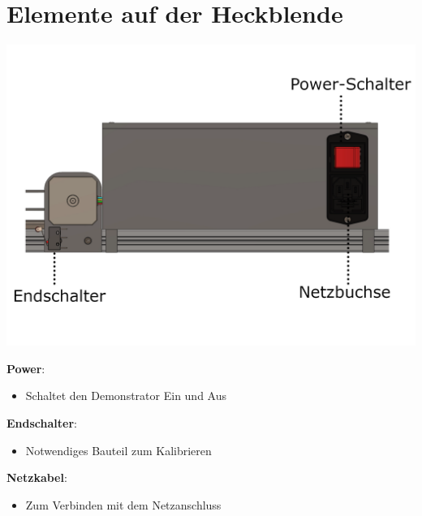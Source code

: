 %
%

\chapter{Elemente auf der Heckblende}
\begin{center}
	
	\includegraphics[width=\textwidth]{Images/Konstruktion3.png}
\end{center}

\textbf{Power}: 
\begin{itemize}
	\item Schaltet den Demonstrator Ein und Aus
\end{itemize}

\textbf{Endschalter}: 
\begin{itemize}
	\item Notwendiges Bauteil zum Kalibrieren
\end{itemize}

\textbf{Netzkabel}: 
\begin{itemize}
	\item Zum Verbinden mit dem Netzanschluss
\end{itemize}
